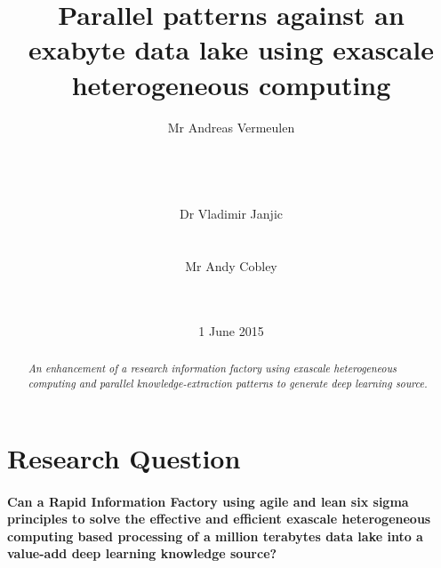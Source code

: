 \documentclass{acm_proc_article-sp}
\begin{document}
\title{Parallel patterns against an exabyte data lake using exascale heterogeneous computing}
\subtitle{}
\author{
\alignauthor
Mr Andreas Vermeulen\\
\\
\\
\\
\\
\alignauthor
Dr Vladimir Janjic\\
\\
\\
\alignauthor
Mr Andy Cobley\\
\\
\\
}
\date{1 June 2015}
\maketitle
\begin{abstract}
\textit{An enhancement of a research information factory using exascale heterogeneous computing and parallel knowledge-extraction patterns to generate deep learning source.}
\end{abstract}
\section{Research Question}
\paragraph{Can a Rapid Information Factory using agile and lean six sigma principles to solve the effective and efficient exascale heterogeneous computing based processing of a million terabytes data lake into a value-add deep learning knowledge source?}
\newpage
\end{document}
